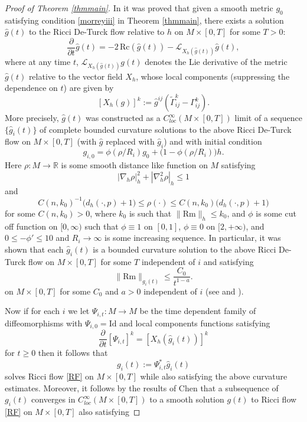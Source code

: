 \documentclass{amsart}
\theoremstyle{definition}
\newcommand{\Rm}{\mathrm{Rm}}
\begin{document}
\begin{proof}[Proof of Theorem \ref{thmmain}]

 In  \cite{LeeLiu} it was proved that given a smooth metric $g_0$ satisfying condition \ref{morreyiii} in Theorem \ref{thmmain}, there exists a solution $\hat{g}(t)$ to the Ricci De-Turck flow relative to $h$ on $M\times[0, T]$ for some $T>0$:
 \begin{equation}\label{LLmainthm}
\frac{\partial}{\partial t} \hat{g}(t)=-2\,\mathrm{Rc}(\hat{g}(t))-
\mathcal{L}_{X_h(\hat{g}(t))} \hat{g}(t),
\end{equation}
 where at any time $t$, $\mathcal{L}_{X_h(\hat{g}(t))} g(t)$ denotes the Lie derivative of the metric $\hat{g}(t)$ relative to the vector field $X_h$, whose local components (suppressing the dependence on $t$) are given by 
  \[
[X_h(g)]^k := \hat{g}^{ij}\left(\tilde{\Gamma}^k_{ij} - \Gamma^k_{ij}\right).
\]
More precisely, $\hat{g}(t)$ was constructed as a $C^{\infty}_{loc}(M\times[0, T])$ limit of a sequence
$\{\hat{g}_i(t)\}$ of complete bounded curvature solutions to the above Ricci De-Turck flow on $M\times[0, T]$ (with $\hat{g}$ replaced with $\hat{g}_i$) and with initial condition 
\[
g_{i,0} = \phi(\rho/R_i) g_0 + \bigl(1-\phi(\rho/R_i)\bigr)h.
\]
Here $\rho:M\to \mathbb{R}$ is some smooth distance like function on $M$ satisfying
\[
|\nabla_h\rho|_h^2 + |\nabla_h^2 \rho|_h \le 1
\]
and
\[
C(n,k_0)^{-1}\bigl(d_h(\cdot,p)+1\bigr)
\le \rho(\cdot) \le
C(n,k_0)\bigl(d_h(\cdot,p)+1\bigr)
\]
for some $C(n,k_0)>0$, where $k_0$ is such that $\|\mathrm{Rm}\|_h \le k_0$, and $\phi$ is some cut off function on $[0,\infty)$ such that $\phi \equiv 1$ on $[0,1]$, $\phi \equiv 0$ on $[2,+\infty)$, and $0 \le -\phi' \le 10$ and $R_i\to \infty$ is some increasing sequence.  In particular, it was shown that each $\hat{g}_i(t)$ is a bounded curvature solution to the above Ricci De-Turck flow on $M\times[0, T]$ for some $T$ independent of $i$ and satisfying
\[
 \|\Rm\|_{g_i(t)}\leq \frac{C_0}{t^{1-a}}.
\]
on $M\times[0, T]$ for some $C_0$ and $a>0$ independent of $i$ (see {\cite[Lemma 2.2]{LeeLiu}} and {\cite[Proposition 2.4]{LeeLiu}}).

 Now if for each $i$ we let $\Psi_{i, t} :M\to M$ be the time dependent family of diffeomorphisms with $\Psi_{i, 0}=\mathrm{Id}$ and local components functions satisfying $$
 \frac{\partial}{\partial t} [\Psi_{i,t}]^k = [X_h(\hat{g}_i(t))]^k$$ 
for $t\geq 0$ then it follows that $$g_i(t):=\Psi_{i,t} ^* \hat{g}_i(t)$$
solves Ricci flow \eqref{RF} on $M\times[0, T]$ while also satisfying the above curvature estimates. Moreover, it follows by the results of Chen \cite{Chen} that a subsequence of $g_i(t)$ converges in $C^{\infty}_{loc}(M\times[0, T])$ to a smooth solution $g(t)$ to Ricci flow \eqref{RF} on $M\times[0, T]$ also satisfying 


\end{proof}
\end{document}
